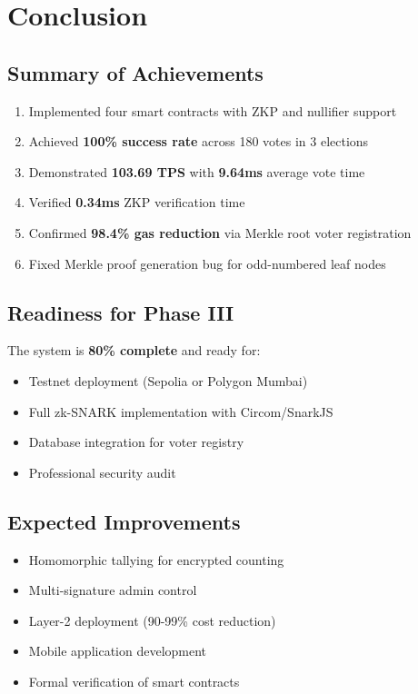 \documentclass[conference]{IEEEtran}
\begin{document}
\section{Conclusion}

\subsection{Summary of Achievements}
\begin{enumerate}
    \item Implemented four smart contracts with ZKP and nullifier support
    \item Achieved \textbf{100\% success rate} across 180 votes in 3 elections
    \item Demonstrated \textbf{103.69 TPS} with \textbf{9.64ms} average vote time
    \item Verified \textbf{0.34ms} ZKP verification time
    \item Confirmed \textbf{98.4\% gas reduction} via Merkle root voter registration
    \item Fixed Merkle proof generation bug for odd-numbered leaf nodes
\end{enumerate}

\subsection{Readiness for Phase III}
The system is \textbf{80\% complete} and ready for:
\begin{itemize}
    \item Testnet deployment (Sepolia or Polygon Mumbai)
    \item Full zk-SNARK implementation with Circom/SnarkJS
    \item Database integration for voter registry
    \item Professional security audit
\end{itemize}

\subsection{Expected Improvements}
\begin{itemize}
    \item Homomorphic tallying for encrypted counting
    \item Multi-signature admin control
    \item Layer-2 deployment (90-99\% cost reduction)
    \item Mobile application development
    \item Formal verification of smart contracts
\end{itemize}
\end{document}
